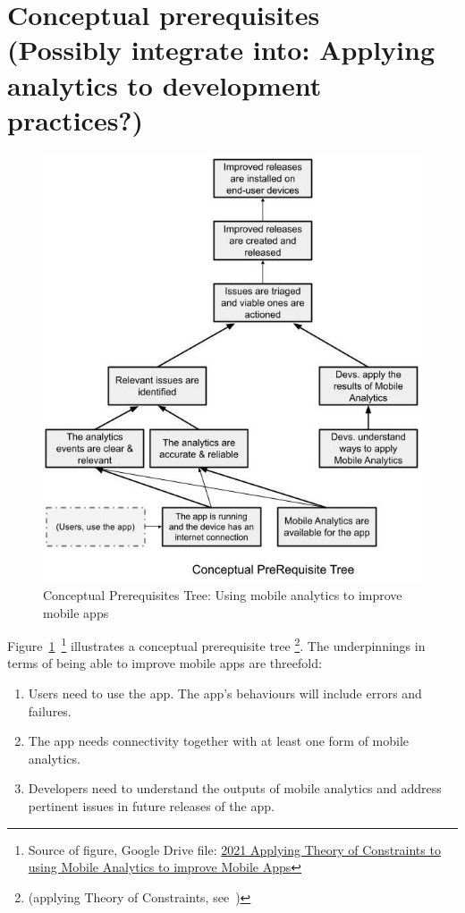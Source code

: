 \section[Conceptual prerequisites]{Conceptual prerequisites\\ \small{(Possibly integrate into: Applying analytics to development practices?)}}
\begin{figure}
    \centering
    \includegraphics[width=12.5cm]{images/my/Conceptual_prereq_tree_Applying_Theory_of_Constraints_to_using_Mobile_Analytics_to_improve_Mobile_Apps.jpeg}
    \caption{Conceptual Prerequisites Tree: Using mobile analytics to improve mobile apps}
    \label{fig:using-toc-cpt-using-mobile-analytics-to-improve-mobile-apps}
\end{figure}


Figure~\ref{fig:using-toc-cpt-using-mobile-analytics-to-improve-mobile-apps}~\footnote{Source of figure, Google Drive file:  \href{https://docs.google.com/document/d/16PaSFRVzg1b2Nykly8qzaTAHtJqtEwgrK754wuek53M/edit}{2021 Applying Theory of Constraints to using Mobile Analytics to improve Mobile Apps}} illustrates a conceptual prerequisite tree \footnote{(applying Theory of Constraints, see~\citep{goldratt2017_necessary_but_not_sufficient, lepore1999_deming_and_goldratt, scheinkopf1999_thinking_for_a_change})}. 
%
The underpinnings in terms of being able to improve mobile apps are threefold: 
\begin{enumerate}
    \item Users need to use the app. The app's behaviours will include errors and failures.
    \item The app needs connectivity together with at least one form of mobile analytics.
    \item Developers need to understand the outputs of mobile analytics and address pertinent issues in future releases of the app.
\end{enumerate}

